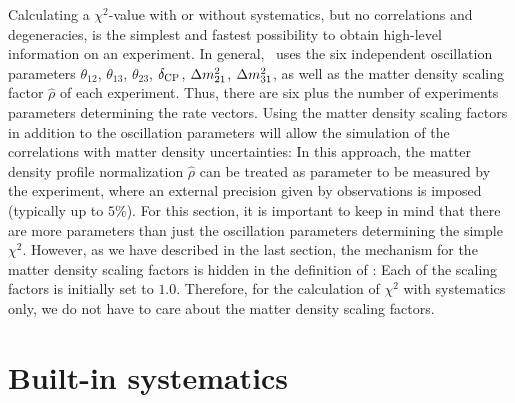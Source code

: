 Calculating a $\chi^2$-value with or without systematics, but no correlations and degeneracies, is the simplest and fastest possibility to obtain high-level information on an experiment. In general, \GLOBES\ uses the six independent oscillation parameters $\theta_{12}$, $\theta_{13}$, $\theta_{23}$, $\delta_{\mathrm{CP}}$, $\Delta m_{21}^2$, $\Delta m_{31}^2$, as well as the matter density 
scaling factor $\hat{\rho}$ of each experiment. Thus, there are six plus the number of experiments parameters determining the rate vectors. Using the matter density scaling factors  in addition to the oscillation parameters will allow the simulation of the correlations with matter density uncertainties: In this
approach, the matter density profile normalization $\hat{\rho}$ can 
be treated
as parameter to be measured by the experiment, where an external precision
given by observations is imposed (typically up to $5\%$). 
 For this section, it is important to keep in mind
that there are more parameters than just the oscillation parameters
determining the simple $\chi^2$. However, as we have described in the
last section, the mechanism for the matter density scaling factors
is hidden in the definition of : Each of the scaling
factors is initially set to $1.0$. Therefore, for the calculation of
$\chi^2$ with systematics only, we do not have to care about the
matter density scaling factors.

\section{Built-in systematics}

